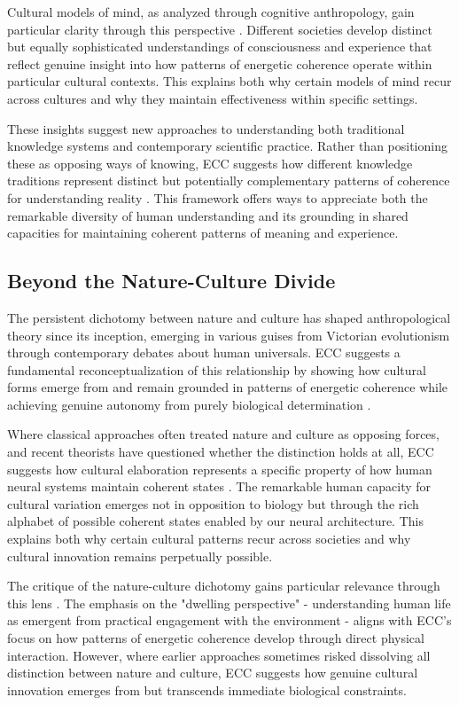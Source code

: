 \begin{refsection}
Cultural models of mind, as analyzed through cognitive anthropology, gain particular clarity through this perspective \cite{boyer2001religion}. Different societies develop distinct but equally sophisticated understandings of consciousness and experience that reflect genuine insight into how patterns of energetic coherence operate within particular cultural contexts. This explains both why certain models of mind recur across cultures and why they maintain effectiveness within specific settings.

These insights suggest new approaches to understanding both traditional knowledge systems and contemporary scientific practice. Rather than positioning these as opposing ways of knowing, ECC suggests how different knowledge traditions represent distinct but potentially complementary patterns of coherence for understanding reality \cite{laughlin1992brain}. This framework offers ways to appreciate both the remarkable diversity of human understanding and its grounding in shared capacities for maintaining coherent patterns of meaning and experience.

\subsection{Beyond the Nature-Culture Divide}

The persistent dichotomy between nature and culture has shaped anthropological theory since its inception, emerging in various guises from Victorian evolutionism through contemporary debates about human universals. ECC suggests a fundamental reconceptualization of this relationship by showing how cultural forms emerge from and remain grounded in patterns of energetic coherence while achieving genuine autonomy from purely biological determination \cite{descola2005beyond}.

Where classical approaches often treated nature and culture as opposing forces, and recent theorists have questioned whether the distinction holds at all, ECC suggests how cultural elaboration represents a specific property of how human neural systems maintain coherent states \cite{latour1993modern}. The remarkable human capacity for cultural variation emerges not in opposition to biology but through the rich alphabet of possible coherent states enabled by our neural architecture. This explains both why certain cultural patterns recur across societies and why cultural innovation remains perpetually possible.

The critique of the nature-culture dichotomy gains particular relevance through this lens \cite{ingold2000perception}. The emphasis on the "dwelling perspective" - understanding human life as emergent from practical engagement with the environment - aligns with ECC's focus on how patterns of energetic coherence develop through direct physical interaction. However, where earlier approaches sometimes risked dissolving all distinction between nature and culture, ECC suggests how genuine cultural innovation emerges from but transcends immediate biological constraints.


\end{refsection}
